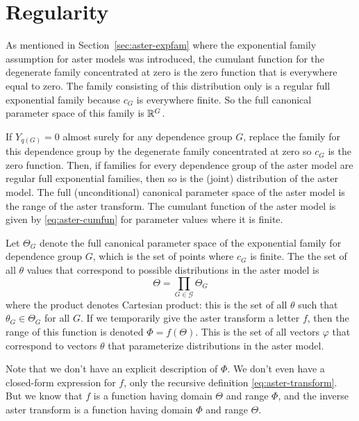 
\chapter{Regularity}
\label{app:regular}

As mentioned in Section~\ref{sec:aster-expfam} where the exponential
family assumption for aster models was introduced, the cumulant function
for the degenerate family concentrated at zero is the zero function
that is everywhere equal to zero.  The family consisting of this distribution
only is a regular full exponential family because $c_G$ is everywhere finite.
So the full canonical parameter space of this family is $\mathbb{R}^G$.

\begin{theorem} \label{th:regular}
If $Y_{q(G)} = 0$ almost surely for any dependence group $G$, replace
the family for this dependence group by the degenerate family concentrated
at zero so $c_G$ is the zero function.
Then, if families for every dependence group of the aster model are regular full
exponential families, then so is the (joint) distribution of the aster model.
The full (unconditional) canonical parameter space of the aster model
is the range of the aster transform.  The cumulant function of the
aster model is given by \eqref{eq:aster-cumfun} for parameter values where
it is finite.
\end{theorem}

Let $\Theta_G$ denote the full canonical parameter space of the exponential
family for dependence group $G$, which is the set of points where $c_G$
is finite.  The the set of all $\theta$ values that correspond to possible
distributions in the aster model is
\begin{equation} \label{eq:reg-prod}
   \Theta = \prod_{G \in \mathcal{G}} \Theta_G
\end{equation}
where the product denotes Cartesian product: this is the set of all $\theta$
such that $\theta_G \in \Theta_G$ for all $G$.
If we temporarily give the aster transform a letter $f$, then
the range of this function is denoted $\Phi = f(\Theta)$.
This is the set of all vectors $\varphi$ that correspond to vectors $\theta$
that parameterize distributions in the aster model.

Note that we don't have an explicit description of $\Phi$.
We don't even have a closed-form expression for $f$, only the recursive
definition \eqref{eq:aster-transform}.  But we know that $f$ is a function
having domain $\Theta$ and range $\Phi$, and the inverse aster transform
is a function having domain $\Phi$ and range $\Theta$.

